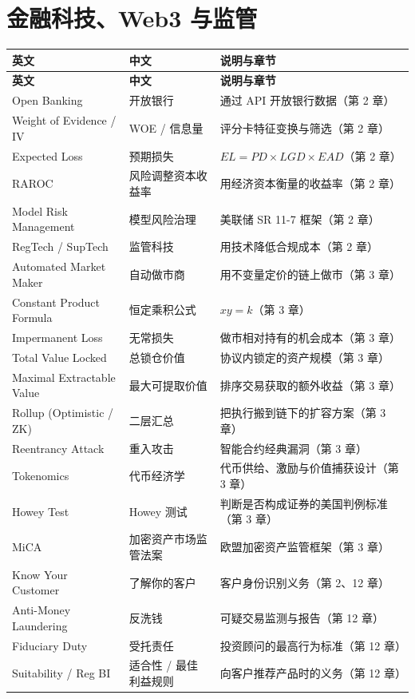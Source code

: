 \section{金融科技、Web3 与监管}

{\tablefont
\begin{longtable}{@{}L{4.6cm}L{3.6cm}L{6.6cm}@{}}
\toprule
\textbf{英文} & \textbf{中文} & \textbf{说明与章节} \\
\midrule
\endfirsthead
\toprule
\textbf{英文} & \textbf{中文} & \textbf{说明与章节} \\
\midrule
\endhead
\bottomrule
\endlastfoot
Open Banking & 开放银行 & 通过 API 开放银行数据（第 2 章） \\
Weight of Evidence / IV & WOE / 信息量 & 评分卡特征变换与筛选（第 2 章） \\
Expected Loss & 预期损失 & $EL=PD\times LGD\times EAD$（第 2 章） \\
RAROC & 风险调整资本收益率 & 用经济资本衡量的收益率（第 2 章） \\
Model Risk Management & 模型风险治理 & 美联储 SR 11-7 框架（第 2 章） \\
RegTech / SupTech & 监管科技 & 用技术降低合规成本（第 2 章） \\
Automated Market Maker & 自动做市商 & 用不变量定价的链上做市（第 3 章） \\
Constant Product Formula & 恒定乘积公式 & $xy=k$（第 3 章） \\
Impermanent Loss & 无常损失 & 做市相对持有的机会成本（第 3 章） \\
Total Value Locked & 总锁仓价值 & 协议内锁定的资产规模（第 3 章） \\
Maximal Extractable Value & 最大可提取价值 & 排序交易获取的额外收益（第 3 章） \\
Rollup (Optimistic / ZK) & 二层汇总 & 把执行搬到链下的扩容方案（第 3 章） \\
Reentrancy Attack & 重入攻击 & 智能合约经典漏洞（第 3 章） \\
Tokenomics & 代币经济学 & 代币供给、激励与价值捕获设计（第 3 章） \\
Howey Test & Howey 测试 & 判断是否构成证券的美国判例标准（第 3 章） \\
MiCA & 加密资产市场监管法案 & 欧盟加密资产监管框架（第 3 章） \\
Know Your Customer & 了解你的客户 & 客户身份识别义务（第 2、12 章） \\
Anti-Money Laundering & 反洗钱 & 可疑交易监测与报告（第 12 章） \\
Fiduciary Duty & 受托责任 & 投资顾问的最高行为标准（第 12 章） \\
Suitability / Reg BI & 适合性 / 最佳利益规则 & 向客户推荐产品时的义务（第 12 章） \\
\end{longtable}
}
